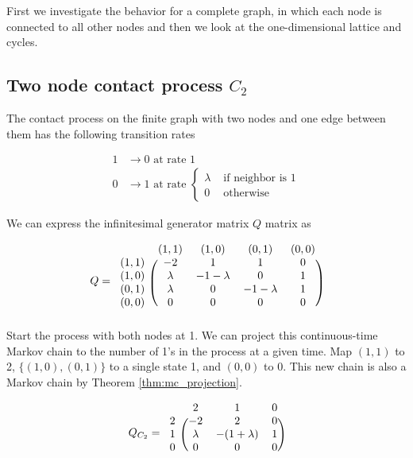 First we investigate the behavior for a complete graph, in which each node is connected to all other nodes and then we look at the one-dimensional lattice and cycles.


\subsection{Two node contact process \texorpdfstring{$C_2$}{C2}}

The contact process on the finite graph with two nodes and one edge between them has the following transition rates

\begin{align*}
    1 &\to 0 \text{ at rate } 1\\
    0 &\to 1 \text{ at rate } \begin{cases}
        \lambda & \text{ if neighbor is 1}\\
        0 & \text{ otherwise}
    \end{cases}
\end{align*}

We can express the infinitesimal generator matrix $Q$ matrix as

$$
Q = \begin{blockarray}{ccccc}
    & (1,1) & (1,0) & (0,1) & (0,0)\\
    \begin{block}{c(cccc)}
        (1,1) & -2 & 1 & 1 & 0\\
        (1,0) & \lambda & - 1 - \lambda & 0 & 1\\
        (0,1) & \lambda & 0 & - 1 - \lambda & 1\\
        (0,0) & 0 & 0 & 0 & 0\\
    \end{block}
\end{blockarray}
$$
Start the process with both nodes at 1.
We can project this continuous-time Markov chain to the number of 1's in the process at a given time.
Map $(1,1)$ to 2, $\{(1,0),(0,1)\}$ to a single state 1, and $(0,0)$ to 0.
This new chain is also a Markov chain by Theorem \ref{thm:mc_projection}.

\begin{equation}\label{eq:q_c_2}
Q_{C_2} = \begin{blockarray}{cccc}
    & 2 & 1 & 0\\
    \begin{block}{c(ccc)}
        2 & -2 & 2 & 0\\
        1 & \lambda & - (1 + \lambda) & 1\\
        0 & 0 & 0 & 0\\
    \end{block}
\end{blockarray}
\end{equation}


